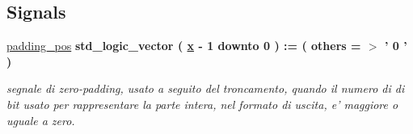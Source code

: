 \subsection*{Signals}
 \begin{DoxyCompactItemize}
\item 
\hyperlink{group___truncate_gac257856843ad01f95857ccecfea5e47e}{padding\+\_\+pos} {\bfseries \textcolor{vhdlchar}{std\+\_\+logic\+\_\+vector}\textcolor{vhdlchar}{ }\textcolor{vhdlchar}{(}\textcolor{vhdlchar}{ }\textcolor{vhdlchar}{ }\textcolor{vhdlchar}{ }\textcolor{vhdlchar}{ }{\bfseries \hyperlink{group___truncate_ga63701d8af27da7452a7588efcff357bc}{x}} \textcolor{vhdlchar}{-\/}\textcolor{vhdlchar}{ } \textcolor{vhdldigit}{1} \textcolor{vhdlchar}{ }\textcolor{vhdlchar}{downto}\textcolor{vhdlchar}{ }\textcolor{vhdlchar}{ } \textcolor{vhdldigit}{0} \textcolor{vhdlchar}{ }\textcolor{vhdlchar}{)}\textcolor{vhdlchar}{ }\textcolor{vhdlchar}{ }\textcolor{vhdlchar}{ }\textcolor{vhdlchar}{\+:}\textcolor{vhdlchar}{=}\textcolor{vhdlchar}{ }\textcolor{vhdlchar}{(}\textcolor{vhdlchar}{ }\textcolor{vhdlchar}{ }\textcolor{vhdlchar}{others}\textcolor{vhdlchar}{ }\textcolor{vhdlchar}{ }\textcolor{vhdlchar}{=}\textcolor{vhdlchar}{ }\textcolor{vhdlchar}{$>$}\textcolor{vhdlchar}{ }\textcolor{vhdlchar}{'}\textcolor{vhdlchar}{ } \textcolor{vhdldigit}{0} \textcolor{vhdlchar}{ }\textcolor{vhdlchar}{'}\textcolor{vhdlchar}{ }\textcolor{vhdlchar}{)}\textcolor{vhdlchar}{ }} 
\begin{DoxyCompactList}\small\item\em segnale di zero-\/padding, usato a seguito del troncamento, quando il numero di di bit usato per rappresentare la parte intera, nel formato di uscita, e' maggiore o uguale a zero. \end{DoxyCompactList}\item 

\end{DoxyCompactItemize}
